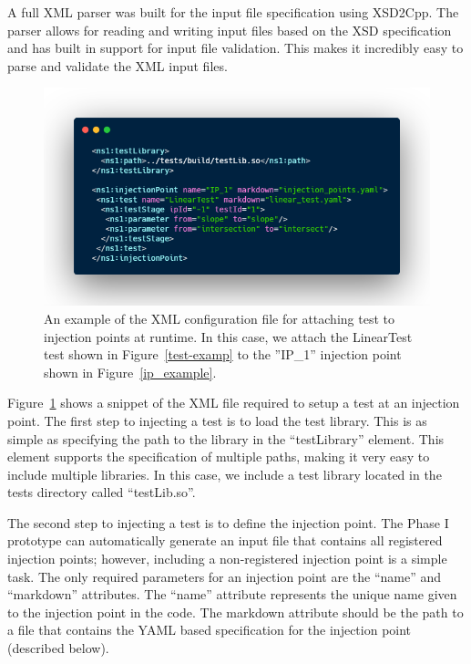 A full XML parser was built for the input file specification using XSD2Cpp. The parser allows for reading and writing input files based on the XSD specification and has built 
in support for input file validation. This makes it incredibly easy to parse and validate the XML input files. 

\begin{figure}
 \includegraphics[width=\textwidth]{./Figures/test-xml1.png}
 \caption{An example of the XML configuration file for attaching test to injection points at runtime. In this case, we attach the LinearTest test shown in Figure~\ref{test-examp} to the ''IP\_1''
 injection point shown in Figure~\ref{ip_example}. \label{test-xml}}
\end{figure}

Figure~\ref{test-xml} shows a snippet of the XML file required to setup a test at an injection point. The first step to injecting a test
is to load the test library. This is as simple as specifying the path to the library in the ``testLibrary'' element. This element supports
the specification of multiple paths, making it very easy to include multiple libraries. In this case, we include a test library located in
the tests directory called ``testLib.so''.

The second step to injecting a test is to define the injection point. The Phase I prototype can automatically generate
an input file that contains all registered injection points; however, including a non-registered injection point is a simple 
task. The only required parameters for an injection point are the ``name'' and ``markdown'' attributes. The ``name'' attribute
represents the unique name given to the injection point in the code. The markdown attribute should be the path to a file that 
contains the YAML based specification for the injection point (described below).

